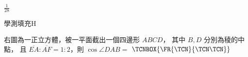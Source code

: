 \begin{QUESTIONS}
\begin{QUESTION}
\begin{QFROMS}
        \end{QFROMS}
        \begin{QTAGS}\end{QTAGS}
        \begin{QANS}
            $\frac{1}{28}$
        \end{QANS}
        \begin{QSOLLIST}
        \end{QSOLLIST}
        \begin{QEMPTYSPACE}
        \end{QEMPTYSPACE}
    \end{QUESTION}
    \begin{QUESTION}
        \begin{ExamInfo}{91}{學測}{填充}{H}
        \end{ExamInfo}
        \begin{ExamAnsRateInfo}{28}{69}{14}{1}
        \end{ExamAnsRateInfo}
        \begin{QBODY}
            右圖為一正立方體，被一平面截出一個四邊形 $ABCD$，
            其中 $B,D$ 分別為稜的中點，
            且 $\overline{EA}: \overline{AF}=1:2$，則 $\cos\angle DAB= $ 
            $\TCNBOX{\FR{\TCN}{\TCN\TCN}}$
            

\end{QBODY}
\end{QUESTION}
\end{QUESTIONS}
